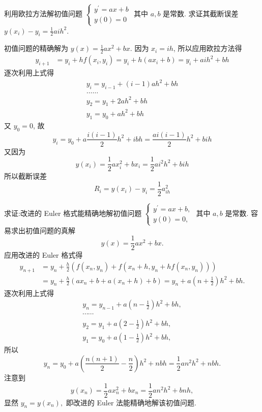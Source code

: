   \begin{tcolorbox}[enhanced,colback=8,colframe=7,breakable,coltitle=green!25!black,title=2024]
 利用欧拉方法解初值问题
$
\left\{\begin{array}{l}
y^{\prime}=a x+b \\
y(0)=0
\end{array}\right.
$
其中 $ a, b $ 是常数. 求证其截断误差 $ y\left(x_{i}\right)-y_{i}=\frac{1}{2} a i h^{2} $.
\tcblower

 初值问题的精确解为 $ y(x)=\frac{1}{2} a x^{2}+b x $.
因为 $ x_{i}=i h $, 所以应用欧拉方法得
$$
\begin{aligned}
y_{i+1} & =y_{i}+h f\left(x_{i}, y_{i}\right)=y_{i}+h\left(a x_{i}+b\right) =y_{i}+a i h^{2}+b h
\end{aligned}
$$
逐次利用上式得
$$
\begin{array}{c}
y_{i}=y_{i-1}+(i-1) a h^{2}+b h \\
\ldots \ldots \\
y_{2}=y_{1}+2 a h^{2}+b h \\
y_{1}=y_{0}+a h^{2}+b h
\end{array}
$$
又 $ y_{0}=0 $, 故
$$
y_{i}=y_{0}+a \frac{i(i-1)}{2} h^{2}+i b h=\frac{a i(i-1)}{2} h^{2}+b i h
$$
又因为
$$
y\left(x_{i}\right)=\frac{1}{2} a x_{i}^{2}+b x_{i}=\frac{1}{2} a i^{2} h^{2}+b i h
$$
所以截断误差
$$
R_{i}=y\left(x_{i}\right)-y_{i}=\frac{1}{2} a_{i h}^{2}
$$
 \end{tcolorbox}

\begin{tcolorbox}[enhanced,colback=8,colframe=7,breakable,coltitle=green!25!black,title=2024]

 求证:改进的 Euler 格式能精确地解初值问题
$
\left\{\begin{array}{l}
y^{\prime}=a x+b, \\
y(0)=0,
\end{array}\right.
$
其中 $ a, b $ 是常数.
\tcblower
容易求出初值问题的真解
$$
y(x)=\frac{1}{2} a x^{2}+b x .
$$
应用改进的 Euler 格式得
$$
\begin{aligned}
y_{n+1} & =y_{n}+\frac{h}{2}\left(f\left(x_{n}, y_{n}\right)+f\left(x_{n}+h, y_{n}+h f\left(x_{n}, y_{n}\right)\right)\right) \\
& =y_{n}+\frac{h}{2}\left(a x_{n}+b+a\left(x_{n}+h\right)+b\right)=y_{n}+a\left(n+\frac{1}{2}\right) h^{2}+b h .
\end{aligned}
$$
逐次利用上式得
$$
\begin{array}{c}
y_{n}=y_{n-1}+a\left(n-\frac{1}{2}\right) h^{2}+b h, \\
\cdots \cdots \\
y_{2}=y_{1}+a\left(2-\frac{1}{2}\right) h^{2}+b h, \\
y_{1}=y_{0}+a\left(1-\frac{1}{2}\right) h^{2}+b h,
\end{array}
$$
所以
$$
y_{n}=y_{0}+a\left(\frac{n(n+1)}{2}-\frac{n}{2}\right) h^{2}+n b h=\frac{1}{2} a n^{2} h^{2}+n b h .
$$
注意到
$$
y\left(x_{n}\right)=\frac{1}{2} a x_{n}^{2}+b x_{n}=\frac{1}{2} a n^{2} h^{2}+b n h,
$$
显然
$y_{n}=y\left(x_{n}\right),$ 即改进的 Euler 法能精确地解该初值问题.
 \end{tcolorbox}

